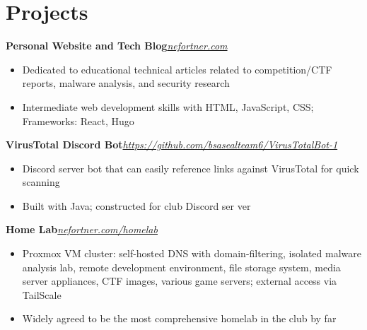\documentclass{article}
\newcommand{\topLevelProjectItem}[2]{
    \textbf{#1}\hfill \emph{#2}\newline
    \vspace{-18pt}\begin{itemize}
}
\newcommand{\topLevelItemEnd}{\end{itemize}\vspace{5pt}}
\newcommand{\lowLevelItem}[1]{
    \item\small{#1}\vspace{-8pt}
}
\begin{document}
    \section*{Projects}
        \topLevelProjectItem{Personal Website and Tech Blog}{\href{https://nefortner.com}{nefortner.com}}
            \lowLevelItem{Dedicated to educational technical articles related to competition/CTF reports, malware analysis, and security research}
            \lowLevelItem{Intermediate web development skills with HTML, JavaScript, CSS; Frameworks: React, Hugo}
        \topLevelItemEnd
        \topLevelProjectItem{VirusTotal Discord Bot}{\href{https://github.com/bsasealteam6/VirusTotalBot-1}{https://github.com/bsasealteam6/VirusTotalBot-1}}
            \lowLevelItem{Discord server bot that can easily reference links against VirusTotal for quick scanning}
            \lowLevelItem{Built with Java; constructed for club Discord ser}ver
        \topLevelItemEnd
        \topLevelProjectItem{Home Lab}{{\href{https://nefortner.com/homelab}{nefortner.com/homelab}}}
            \lowLevelItem{Proxmox VM cluster: self-hosted DNS with domain-filtering, isolated malware analysis lab, remote development environment, file storage system, media server appliances, CTF images, various game servers; external access via TailScale}
            \lowLevelItem{Widely agreed to be the most comprehensive homelab in the club by far}
        \topLevelItemEnd
\end{document}

